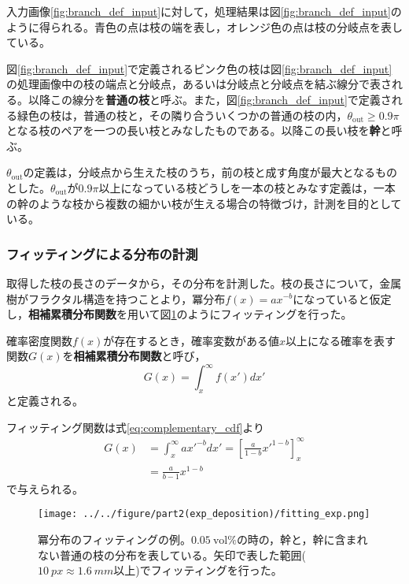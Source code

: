\documentclass[autodetect-engine,dvi=dvipdfmx,a4paper,ja=standard,oneside,openany,11pt]{bxjsbook}
\begin{document}
入力画像\ref{fig:branch_def_input}に対して，処理結果は図\ref{fig:branch_def_input}のように得られる。青色の点は枝の端を表し，オレンジ色の点は枝の分岐点を表している。

図\ref{fig:branch_def_input}で定義されるピンク色の枝は図\ref{fig:branch_def_input}の処理画像中の枝の端点と分岐点，あるいは分岐点と分岐点を結ぶ線分で表される。以降この線分を\textbf{普通の枝}と呼ぶ。また，図\ref{fig:branch_def_input}で定義される緑色の枝は，普通の枝と，その隣り合ういくつかの普通の枝の内，$\theta_{\mathrm{out}}\geq 0.9\pi$となる枝のペアを一つの長い枝とみなしたものである。以降この長い枝を\textbf{幹}と呼ぶ。

$\theta_{\mathrm{out}}$の定義は，分岐点から生えた枝のうち，前の枝と成す角度が最大となるものとした。$\theta_{\mathrm{out}}$が$0.9\pi$以上になっている枝どうしを一本の枝とみなす定義は，一本の幹のような枝から複数の細かい枝が生える場合の特徴づけ，計測を目的としている。

\subsubsection{フィッティングによる分布の計測}
取得した枝の長さのデータから，その分布を計測した。枝の長さについて，金属樹がフラクタル構造を持つことより，冪分布$f(x)=ax^{-b}$になっていると仮定し，\textbf{相補累積分布関数}を用いて図\ref{fig:fitting_exp}のようにフィッティングを行った。

確率密度関数$f(x)$が存在するとき，確率変数がある値$x$以上になる確率を表す関数$G(x)$を\textbf{相補累積分布関数}と呼び，
\begin{equation}
  G(x) = \int_{x}^{\infty} f(x')dx'
  \label{eq:complementary_cdf}
\end{equation}
と定義される。

フィッティング関数は式\eqref{eq:complementary_cdf}より
\begin{equation}
  \begin{split}
    G(x) & = \int_{x}^{\infty} ax'^{-b}dx' = \left[ \frac{a}{1-b}x'^{1-b} \right]_{x}^{\infty} \\
         & = \frac{a}{b-1}x^{1-b}
  \end{split}
\end{equation}
で与えられる。
\begin{figure}[htbp]
  \centering
  \texttt{[image: ../../figure/part2(exp\_deposition)/fitting\_exp.png]}
  \caption{冪分布のフィッティングの例。$\SI{0.05}{\mathrm{vol}\%}$の時の，幹と，幹に含まれない普通の枝の分布を表している。矢印で表した範囲($\SI{10}{px}\approx\SI{1.6}{mm}$以上)でフィッティングを行った。}
  \label{fig:fitting_exp}
\end{figure}
\end{document}
